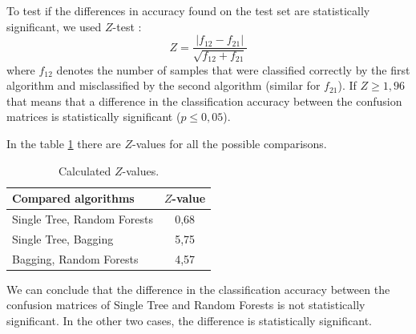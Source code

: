 \documentclass[a4paper,11pt]{article}
\begin{document}
To test if the differences in accuracy found on the test set are statistically significant, we used $Z$-test \cite{accuracy}:
\[
Z = \frac{|f_{12} - f_{21}|}{\sqrt{f_{12} + f_{21}}}
\]
where $f_{12}$ denotes the number of samples that were classified correctly by the first algorithm and misclassified by the second algorithm (similar for $f_{21}$). If $Z \geq 1{,}96$ that means that a difference in the classification accuracy between the confusion matrices is statistically significant ($p \leq 0{,}05$).

\newpage

In the table \ref{tab: z} there are $Z$-values for all the possible comparisons.
\begin{table}[h!]
\centering
	\begin{tabular}{l||c}
	Compared algorithms & $Z$-value   \\ \hline \hline
	Single Tree, Random Forests & 0{,}68 \\ \hline
	Single Tree, Bagging &  5{,}75 \\ \hline
	Bagging, Random Forests & 4{,}57
	\end{tabular}
	\caption{Calculated $Z$-values.}
	\label{tab: z}
\end{table}

We can conclude that the difference in the classification accuracy between the confusion matrices of Single Tree and Random Forests is not statistically significant. In the other two cases, the difference is statistically significant.



\end{document}
